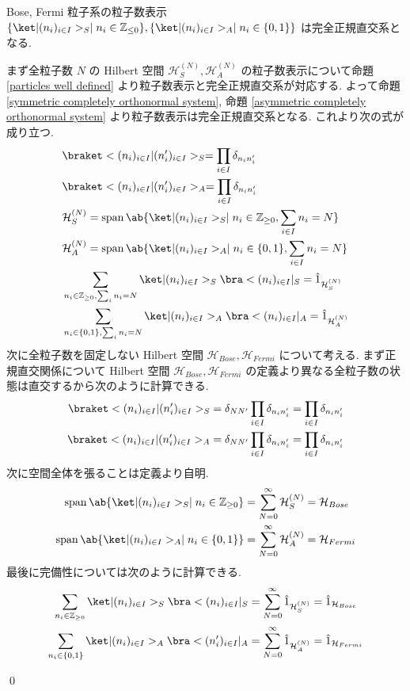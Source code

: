 \documentclass[uplatex,dvipdfmx,a4paper,11pt]{jlreq}
\makeatletter
\DeclareMathOperator{\Span}{span}
\newcommand{\ZZ}{\mathbb{Z}}
\newcommand{\HH}{\mathcal{H}}
\numberwithin{equation}{section}
\theoremstyle{definition}
\renewenvironment{proof}[1][\proofname]{\par
  \normalfont
  \topsep6\p@\@plus6\p@ \trivlist
  \item[\hskip\labelsep{\bfseries #1}\@addpunct{\bfseries}]\ignorespaces\quad\par
}{
  \qed\endtrivlist\@endpefalse
}
\renewcommand\proofname{証明}
\makeatother
\begin{document}
\begin{theorem}
  Bose, Fermi 粒子系の粒子数表示 $\{\ket|(n_i)_{i\in I}>_S \mid n_i\in\ZZ_{\leq 0} \}, \{\ket|(n_i)_{i\in I}>_A \mid n_i\in\{0, 1\}\}$ は完全正規直交系となる.
\end{theorem}
\begin{proof}
  まず全粒子数 $N$ の Hilbert 空間 $\HH_S^{(N)}, \HH_A^{(N)}$ の粒子数表示について命題 \ref{particles well defined} より粒子数表示と完全正規直交系が対応する.
  よって命題 \ref{symmetric completely orthonormal system}, 命題 \ref{asymmetric completely orthonormal system} より粒子数表示は完全正規直交系となる.
  これより次の式が成り立つ.
  \begin{align}
     & \braket<(n_i)_{i\in I}|(n_i')_{i\in I}>_S = \prod_{i\in I}\delta_{n_in_i'}                                    \\
     & \braket<(n_i)_{i\in I}|(n_i')_{i\in I}>_A = \prod_{i\in I}\delta_{n_in_i'}                                    \\
     & \HH_S^{(N)} = \Span\ab\{\ket|(n_i)_{i\in I}>_S \mid n_i\in\ZZ_{\geq 0}, \sum_{i\in I}n_i = N \}               \\
     & \HH_A^{(N)} = \Span\ab\{\ket|(n_i)_{i\in I}>_A \mid n_i\in\{0, 1\}, \sum_{i\in I}n_i = N \}                   \\
     & \sum_{n_i\in\ZZ_{\geq 0}, \sum_i n_i = N}\ket|(n_i)_{i\in I}>_S\bra<(n_i)_{i\in I}|_S = \hat{1}_{\HH_S^{(N)}} \\
     & \sum_{n_i\in\{0, 1\}, \sum_i n_i = N} \ket|(n_i)_{i\in I}>_A\bra<(n_i)_{i\in I}|_A = \hat{1}_{\HH_A^{(N)}}
  \end{align}
  次に全粒子数を固定しない Hilbert 空間 $\HH_{Bose}, \HH_{Fermi}$ について考える.
  まず正規直交関係について Hilbert 空間 $\HH_{Bose}, \HH_{Fermi}$ の定義より異なる全粒子数の状態は直交するから次のように計算できる.
  \begin{align}
    \braket<(n_i)_{i\in I}|(n_i')_{i\in I}>_S & = \delta_{NN'}\prod_{i\in I}\delta_{n_in_i'} = \prod_{i\in I}\delta_{n_in_i'} \\
    \braket<(n_i)_{i\in I}|(n_i')_{i\in I}>_A & = \delta_{NN'}\prod_{i\in I}\delta_{n_in_i'} = \prod_{i\in I}\delta_{n_in_i'}
  \end{align}
  次に空間全体を張ることは定義より自明.
  \begin{align}
    \Span\ab\{\ket|(n_i)_{i\in I}>_S \mid n_i\in\ZZ_{\geq 0} \} & = \sum_{N = 0}^{\infty}\HH_S^{(N)} = \HH_{Bose}  \\
    \Span\ab\{\ket|(n_i)_{i\in I}>_A \mid n_i\in\{0, 1\} \}     & = \sum_{N = 0}^{\infty}\HH_A^{(N)} = \HH_{Fermi}
  \end{align}
  最後に完備性については次のように計算できる.
  \begin{align}
    \sum_{n_i\in\ZZ_{\geq 0}}\ket|(n_i)_{i\in I}>_S\bra<(n_i)_{i\in I}|_S & = \sum_{N = 0}^{\infty}\hat{1}_{\HH_S^{(N)}} = \hat{1}_{\HH_{Bose}}  \\
    \sum_{n_i\in\{0, 1\}} \ket|(n_i)_{i\in I}>_A\bra<(n_i')_{i\in I}|_A   & = \sum_{N = 0}^{\infty}\hat{1}_{\HH_A^{(N)}} = \hat{1}_{\HH_{Fermi}}
  \end{align}
\end{proof}
\end{document}
